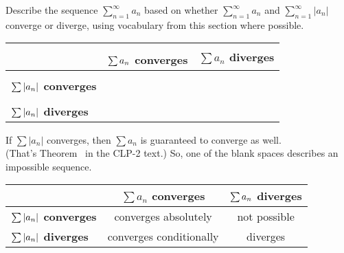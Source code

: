 \begin{Mquestion}
Describe the sequence $\displaystyle\sum_{n=1}^\infty a_n$ based on whether
$\displaystyle\sum_{n=1}^\infty a_n$ and $\displaystyle\sum_{n=1}^\infty |a_n|$ converge or diverge, using vocabulary from this section where possible.
\begin{center}
\begin{tabular}{|l|c|c|}
\hline
& \textbf{$\sum\limits^{\vphantom{{\frac12}}}  a_n$ converges} & \textbf{$\sum a_n$ diverges}\\[10pt]
\hline
 \textbf{$\sum\limits^{\vphantom{{\frac12}}}  |a_n|$ converges}&&\\[10pt]
 \hline
  \textbf{$\sum\limits^{\vphantom{{\frac12}}}  |a_n|$ diverges}&&\\[10pt]
  \hline
\end{tabular}
\end{center}

\end{Mquestion}
\begin{hint}
If $\sum |a_n|$ converges, then $\sum a_n$ is guaranteed to converge as well. \\
(That's Theorem~ in the CLP-2 text.) So, one of the blank spaces describes an impossible sequence.
\end{hint}
\begin{answer}
\begin{center}
\begin{tabular}{|l|c|c|}
\hline
& \textbf{$\sum a_n$ converges} & \textbf{$\sum\vphantom{^{\frac12}} a_n$ diverges}\\[10pt]
\hline
 \textbf{$\sum\vphantom{^{\frac12}}  |a_n|$ converges}&converges absolutely&not possible\\[10pt]
 \hline
  \textbf{$\sum\vphantom{^{\frac12}}  |a_n|$ diverges}&converges conditionally&diverges\\[10pt]
  \hline
\end{tabular}
\end{center}
\end{answer}
